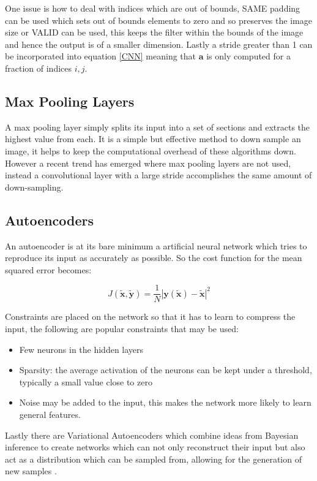     One issue is how to deal with indices which are out of bounds, SAME padding can be used which sets out of bounds
    elements to zero and so preserves the image size or VALID can be used, this keeps the filter within the bounds of the
    image and hence the output is of a smaller dimension. Lastly a stride greater than 1 can be incorporated into equation
    \ref{CNN} meaning that $\mathbf{a}$ is only computed for a fraction of indices $i,j$.
  \subsection{Max Pooling Layers}
    A max pooling layer simply splits its input into a set of sections and extracts
    the highest value from each. It is a simple but effective method to down sample
    an image, it helps to keep the computational overhead of these algorithms
    down. However a recent trend \cite{Springenberg2015} has emerged where max pooling
    layers are not used, instead a convolutional layer with a large stride accomplishes
    the same amount of down-sampling.
  \subsection{Autoencoders}
    An autoencoder is at its bare minimum a artificial neural network which tries
    to reproduce its input as accurately as possible. So the cost function for the mean squared error becomes:

    \begin{equation} \label{eq:autoencoder_cost}
      J(\tilde{\mathbf{x}},\tilde{\mathbf{y}}) = \frac{1}{N}\left |\mathbf{y}(\tilde{\mathbf{x}})-\tilde{\mathbf{x}}\right | ^2
    \end{equation}

    Constraints are
    placed on the network so that it has to learn to compress the input, the following
    are popular constraints that may be used:
    \begin{itemize}
      \item Few neurons in the hidden layers
      \item Sparsity: the average activation of the neurons can be kept under a
      threshold, typically a small value close to zero \cite{autong}
      \item Noise may be added to the input, this makes the network more likely
      to learn general features.
    \end{itemize}
    Lastly there are Variational Autoencoders which combine ideas from Bayesian inference
    to create networks which can not only reconstruct their input but also act as a
    distribution which can be sampled from, allowing for the generation of new samples \cite{Kingma2013}.

